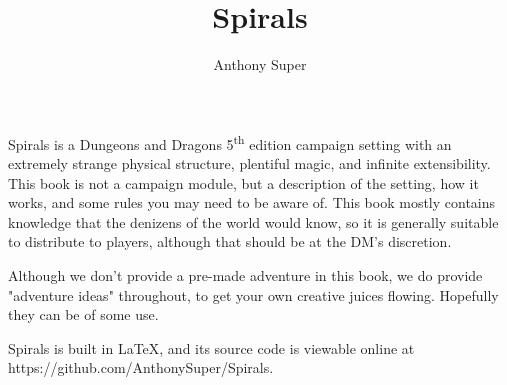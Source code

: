 \documentclass[a4paper]{book}
\title{Spirals}
\author{Anthony Super}
\begin{document}
\setcounter{tocdepth}{1}

\maketitle



Spirals is a Dungeons and Dragons 5\textsuperscript{th} edition campaign setting with an extremely strange physical structure, plentiful magic, and infinite extensibility.
This book is not a campaign module, but a description of the setting, how it works, and some rules you may need to be aware of.
This book mostly contains knowledge that the denizens of the world would know, so it is generally suitable to distribute to players, although that should be at the DM's discretion.

Although we don't provide a pre-made adventure in this book, we do provide "adventure ideas" throughout, to get your own creative juices flowing.
Hopefully they can be of some use.

Spirals is built in \LaTeX, and its source code is viewable online at https://github.com/AnthonySuper/Spirals.




\listoftodos
\tableofcontents 











\printindex
\end{document}
